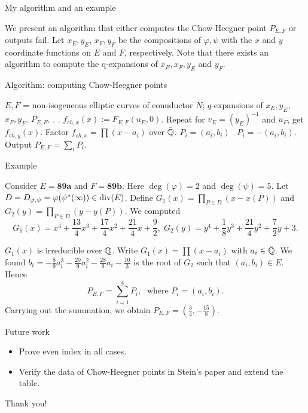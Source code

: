 \documentclass[handout]{beamer}
\begin{document}
\begin{frame}{My algorithm and an example}

We present an algorithm that either computes the Chow-Heegner point $P_{E,F}$ or outputs fail. Let $x_E, y_E$, $x_F,y_F$ be the compositions of $\varphi, \psi$ with the $x$ and $y$ coordinate functions on $E$ and $F$, respectively. Note that there exists an algorithm to compute the q-expansions of $x_E,x_F,y_E$ and $y_F$.  

\end{frame}

\begin{frame}{Algorithm: computing Chow-Heegner points}
\begin{algorithm}[H]
\begin{algorithmic}              %
    \Require  $E, F$  = non-isogeneous elliptic curves of conuductor $N$;
    $q$-expansions of $x_E, y_E$, $x_F,y_F$.
    \Ensure $P_{E,F}$.
        .
    .
    \State $f_{ch,x}(x) := F_{E,F}(u_E,0)$.
    \State Repeat for $v_E = (y_E)^{-1}$ and $u_F$, get $f_{ch,y}(x)$.
    \State Factor $f_{ch,x} = \prod (x-a_i)$ over $\bar{\mathbb{Q}}$.
      $P_i = (a_i,b_i)$ \Else  \,  $P_i = - (a_i, b_i)$.
    \EndIf
    \EndFor
\State Output $P_{E,F} = \sum_i P_i$.
\end{algorithmic}
\end{algorithm}
\end{frame}

\begin{frame}{Example}

\begin{Example}
Consider $E = \textbf{89a}$ and $F = \textbf{89b}$. Here $\deg(\varphi) = 2$ and $\deg(\psi) = 5$. Let 
$D = D_{\varphi, \psi}= \varphi(\psi^*(\infty)) \in \operatorname{div}(E)$. Define $G_1(x) = \prod_{P \in D} (x - x(P))$ 
and $G_2(y) = \prod_{P \in D} (y - y(P))$. We computed 
\[
G_1(x) = x^{4} + \frac{13}{4} x^{3} + \frac{17}{4} x^{2} + \frac{21}{4} x + \frac{9}{2}, \; G_2(y) = y^{4} + \frac{1}{8} y^{3} + \frac{21}{4} y^{2} + \frac{7}{2} y + 3.
\]

$G_1(x)$ is irreducible over $\mathbb{Q}$. Write $G_1(x) = \prod (x-a_i)$ with $a_i \in \bar{\mathbb{Q}}$. We found  $b_i = -\frac{8}{9} a_i^{3} - \frac{20}{9} a_i^{2} - \frac{28}{9} a_i - \frac{10}{3}$ is the root of $G_2$ such that $(a_i,b_i) \in E$. Hence 
	$$P_{E,F} = \sum_{i=1}^4 P_i, \; \mbox{ where } P_i = (a_i, b_i).$$
Carrying out the summation, we obtain $P_{E,F} = (\frac{3}{4},-\frac{15}{8})$. 

\end{Example}


\end{frame}

\begin{frame}{Future work}

\begin{itemize}
\item Prove even index in all cases. 
\item Verify the data of Chow-Heegner points in Stein's paper and extend the table.
\end{itemize}

\end{frame}

\begin{frame}
\Huge{\centerline{Thank you!}}
\end{frame}
\end{document}
